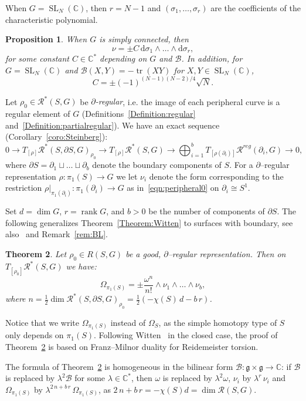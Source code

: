 \documentclass[11pt]{article}
\newtheorem{theo}{Theorem}[section]
\newtheorem{prop}[theo]{Proposition}
\theoremstyle{definition}
\numberwithin{equation}{section}
\numberwithin{figure}{section}
\numberwithin{table}{section}
\DeclareMathOperator{\SL}{SL}
\DeclareMathOperator{\rank}{rank}
\DeclareMathOperator{\tr}{tr}
\newcommand{\Bcal}{\mathcal{B}}
\newcommand{\Rcal}{\mathcal{R}}
\newcommand{\Cbb}{\mathbb{C}}
\newcommand{\gfrk}{\mathfrak{g}}
\newcommand*{\dd}{\mathrm{d}}
\newcommand*\dG{{d}}
\newcommand*\rG{r}
\newcommand*\bS{b}
\newcommand*\Rg{\Rcal^*}
\begin{document}
When $G=\SL_N (\Cbb)$, then $r=N-1$ and $(\sigma_1,\dots,\sigma_r)$ are the coefficients of the characteristic polynomial.


\begin{prop}\label{prop:Steinberg}
When $G$ is simply connected, then
\[
\nu= \pm C\, \dd\sigma_1\wedge\dots \wedge \dd\sigma_r,
\]
for some constant $C\in\Cbb^*$ depending on $G$ and $\Bcal$. In addition, for $G=\SL_N (\Cbb)$ and $\Bcal(X,Y)=- \tr(XY)$ for $X,Y\in \SL_N (\Cbb)$,
\[
C=\pm (-1)^{(N-1)(N-2)/4}\sqrt{N}.
\]
\end{prop}


Let $\rho_0\in \Rg(S,G) $ be \emph{$\partial$-regular}, i.e. the image of each peripheral curve is a regular element of $G$ (Definitions~\ref{Definition:regular} and~\ref{Definition:partialregular}). We have an exact sequence (Corollary~\ref{coro:Steinberg}):
\[
0\to T_{[\rho]}\Rcal^*(S,\partial S,G)_{\rho_0} \to T_{[\rho]}\Rcal^*(S,G) \to \bigoplus_{i=1}^b T_{[\rho(\partial_i)]} \Rcal^{reg}(\partial_i, G)
\to 0,
\]
where $\partial S=\partial_1\sqcup\dots\sqcup \partial_\bS$ denote the boundary components of $S$. For a $\partial$--regular representation $\rho\colon\pi_1(S)\to G$ we let $\nu_i$ denote the form corresponding to the restriction $\rho|_{\pi_1(\partial_i)}\colon \pi_1(\partial_i)\to G$ as in~\eqref{eqn:peripheral0} on $\partial_i\cong S^1$.

Set $\dG=\dim G$, $r=\rank G$, and $\bS>0$ be the number of components of $\partial S$. The following generalizes Theorem~\ref{Theorem:Witten} to surfaces with boundary, \cite{Witten} see also~\cite[Theorem~5.40]{BL} and Remark~\ref{rem:BL}.


\begin{theo}\label{Thm:vol}
Let $\rho_0\in R(S,G)$ be a good, $\partial$--regular representation. Then on $T_{[\rho_0]} \Rg(S,G)$ we have:
\[
\Omega_{\pi_1(S)}=\pm
\frac{\omega^n}{n!}\wedge \nu_1\wedge\dots\wedge\nu_\bS,
\]
where $n = \frac{1}{2} \dim \Rcal^*(S,\partial S,G)_{\rho_0} = \frac12(-\chi(S)\, \dG - b\, r)$.
\end{theo}

Notice that we write $\Omega_{\pi_1(S)}$ instead of $\Omega_{S}$, as the simple homotopy type of $S$ only depends on $\pi_1(S)$. Following Witten~\cite{Witten} in the closed case, the proof of Theorem~\ref{Thm:vol} is based on Franz--Milnor duality for Reidemeister torsion.

The formula of Theorem~\ref{Thm:vol} is homogeneous in the bilinear form $\Bcal\colon\gfrk\times\gfrk\to\Cbb $: if $\Bcal$ is replaced by $\lambda^2\Bcal$ for some $\lambda\in\Cbb^* $, then $\omega$ is replaced by $\lambda^2\omega $, $\nu_i$ by $\lambda^\rG\, \nu_i$ and $ \Omega_{\pi_1(S)}$ by $ \lambda^{2\,n+ b\, r}\, \Omega_{\pi_1(S)}$, as $ {2\,n+b\,r}=-\chi(S)d=\dim \Rcal(S,G) $.
\end{document}
